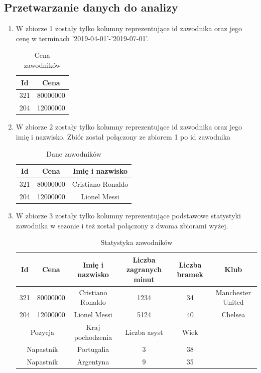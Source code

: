 \documentclass{article}
\begin{document}
\subsection{Przetwarzanie danych do analizy}

\begin{enumerate}
    \item W zbiorze 1 zostały tylko kolumny reprezentujące id zawodnika oraz jego cenę w terminach '2019-04-01'-'2019-07-01'.
    \begin{table}[htb]
        \centering
        \caption{Cena zawodników}
        \label{tab:vehicle_data_1}
        \begin{tabular}{cc}
        \toprule
        Id & Cena  \\
        \midrule
        321 & 80000000  \\
        204 & 12000000  \\
        \bottomrule
        \end{tabular}
    \end{table}

    \item W zbiorze 2 zostały tylko kolumny reprezentujące id zawodnika oraz jego imię i nazwisko. Zbiór został połączony ze zbiorem 1 po id zawodnika

   \begin{table}[htb]
        \centering
        \caption{Dane zawodników}
        \label{tab:vehicle_data_1}
        \begin{tabular}{ccc}
        \toprule
        Id & Cena & Imię i nazwisko  \\
        \midrule
        321 & 80000000 & Cristiano Ronaldo \\
        204 & 12000000 & Lionel Messi  \\
        \bottomrule
        \end{tabular}
    \end{table}    
    
    \item W zbiorze 3 zostały tylko kolumny reprezentujące podstawowe statystyki zawodnika w sezonie i też został połączony z dwoma zbiorami wyżej. 
    
   \begin{table}[H]
    \centering
    \caption{Statystyka zawodników}
    \label{tab:vehicle_data_1}
    \begin{tabular}{cccccc}
    \toprule
    Id & Cena & Imię i nazwisko & Liczba zagranych minut & Liczba bramek & Klub  \\
    \midrule
    321 & 80000000 & Cristiano Ronaldo & 1234 & 34 & Manchester United\\
    204 & 12000000 & Lionel Messi & 5124 & 40 & Chelsea\\
    \midrule
    \multicolumn{2}{c}{Pozycja} & Kraj pochodzenia & Liczba asyst & Wiek & \\
    \midrule
    \multicolumn{2}{c}{Napastnik} & Portugalia & 3 & 38 & \\
    \multicolumn{2}{c}{Napastnik} & Argentyna & 9 & 35 & \\
    \bottomrule
    \end{tabular}
\end{table}



\end{enumerate}
\end{document}
